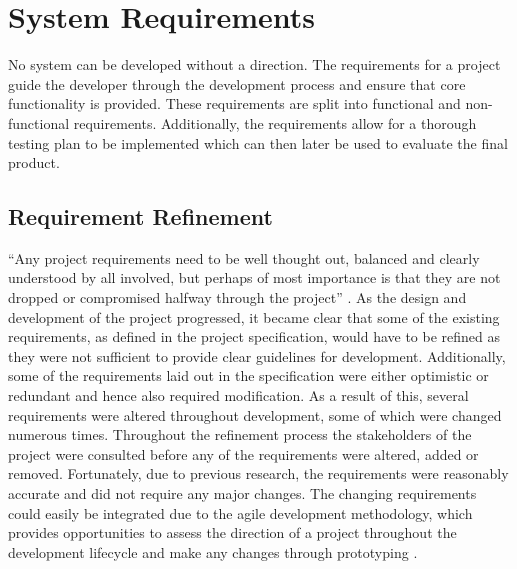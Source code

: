\chapter{System Requirements}
\label{Chapter:SystemRequirements}
No system can be developed without a direction. The requirements for a project guide the developer through the development process and ensure that core functionality is provided. These requirements are split into functional and non-functional requirements. Additionally, the requirements allow for a thorough testing plan to be implemented which can then later be used to evaluate the final product. 

\section{Requirement Refinement}
``Any project requirements need to be well thought out, balanced and clearly understood by all involved, but perhaps of most importance is that they are not dropped or compromised halfway through the project'' \cite{ReQTest:Requirements}. As the design and development of the project progressed, it became clear that some of the existing requirements, as defined in the project specification, would have to be refined as they were not sufficient to provide clear guidelines for development. Additionally, some of the requirements laid out in the specification were either optimistic or redundant and hence also required modification. As a result of this, several requirements were altered throughout development, some of which were changed numerous times. Throughout the refinement process the stakeholders of the project were consulted before any of the requirements were altered, added or removed. Fortunately, due to previous research, the requirements were reasonably accurate and did not require any major changes. The changing requirements could easily be integrated due to the agile development methodology, which provides opportunities to assess the direction of a project throughout the development lifecycle and make any changes through prototyping \cite{Agile:Home}.


